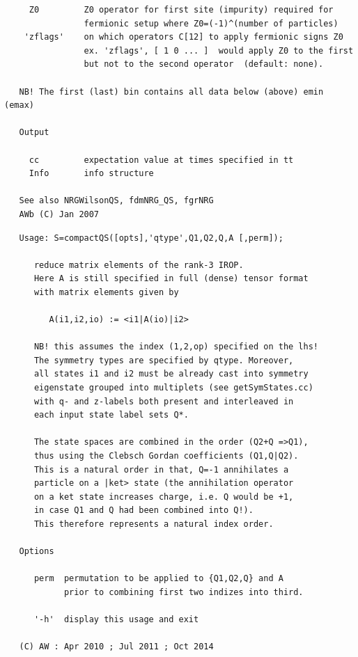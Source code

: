 \documentclass[twoside,12pt]{article}
\begin{document}
\begin{verbatim}
     Z0         Z0 operator for first site (impurity) required for
                fermionic setup where Z0=(-1)^(number of particles)
    'zflags'    on which operators C[12] to apply fermionic signs Z0
                ex. 'zflags', [ 1 0 ... ]  would apply Z0 to the first
                but not to the second operator  (default: none).
 
   NB! The first (last) bin contains all data below (above) emin (emax)
 
   Output
 
     cc         expectation value at times specified in tt
     Info       info structure
 
   See also NRGWilsonQS, fdmNRG_QS, fgrNRG
   AWb (C) Jan 2007
\end{verbatim}

\pagebreak[3]



\begin{verbatim}
   Usage: S=compactQS([opts],'qtype',Q1,Q2,Q,A [,perm]);
 
      reduce matrix elements of the rank-3 IROP.
      Here A is still specified in full (dense) tensor format
      with matrix elements given by
 
         A(i1,i2,io) := <i1|A(io)|i2>
 
      NB! this assumes the index (1,2,op) specified on the lhs!
      The symmetry types are specified by qtype. Moreover,
      all states i1 and i2 must be already cast into symmetry
      eigenstate grouped into multiplets (see getSymStates.cc)
      with q- and z-labels both present and interleaved in
      each input state label sets Q*.
 
      The state spaces are combined in the order (Q2+Q =>Q1),
      thus using the Clebsch Gordan coefficients (Q1,Q|Q2).
      This is a natural order in that, Q=-1 annihilates a
      particle on a |ket> state (the annihilation operator
      on a ket state increases charge, i.e. Q would be +1,
      in case Q1 and Q had been combined into Q!).
      This therefore represents a natural index order.
 
   Options
 
      perm  permutation to be applied to {Q1,Q2,Q} and A
            prior to combining first two indizes into third.
 
      '-h'  display this usage and exit
 
   (C) AW : Apr 2010 ; Jul 2011 ; Oct 2014
\end{verbatim}
\end{document}
